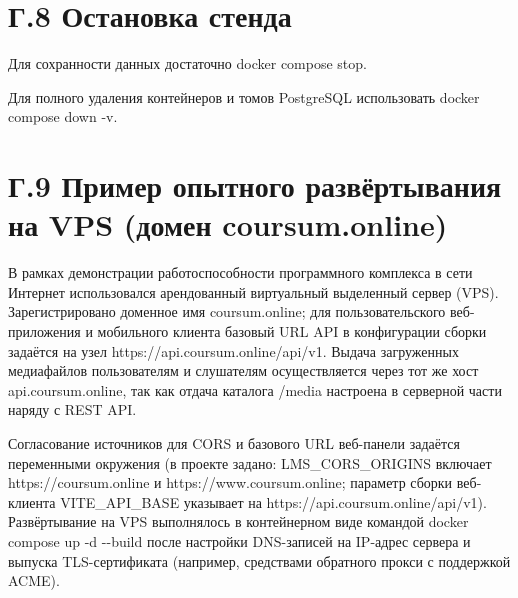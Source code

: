 \section*{Г.8 Остановка стенда}

Для сохранности данных достаточно docker compose stop.

Для полного удаления контейнеров и томов PostgreSQL использовать docker compose down -v.

\section*{Г.9 Пример опытного развёртывания на VPS (домен coursum.online)}

В рамках демонстрации работоспособности программного комплекса в сети Интернет использовался арендованный виртуальный выделенный сервер (VPS). Зарегистрировано доменное имя coursum.online; для пользовательского веб-приложения и мобильного клиента базовый URL API в конфигурации сборки задаётся на узел https://api.coursum.online/api/v1. Выдача загруженных медиафайлов пользователям и слушателям осуществляется через тот же хост api.coursum.online, так как отдача каталога /media настроена в серверной части наряду с REST API.

Согласование источников для CORS и базового URL веб-панели задаётся переменными окружения (в проекте задано: LMS\_CORS\_ORIGINS включает https://coursum.online и https://www.coursum.online; параметр сборки веб-клиента VITE\_API\_BASE указывает на https://api.coursum.online/api/v1). Развёртывание на VPS выполнялось в контейнерном виде командой docker compose up -d {-}{-}build после настройки DNS-записей на IP-адрес сервера и выпуска TLS-сертификата (например, средствами обратного прокси с поддержкой ACME).
